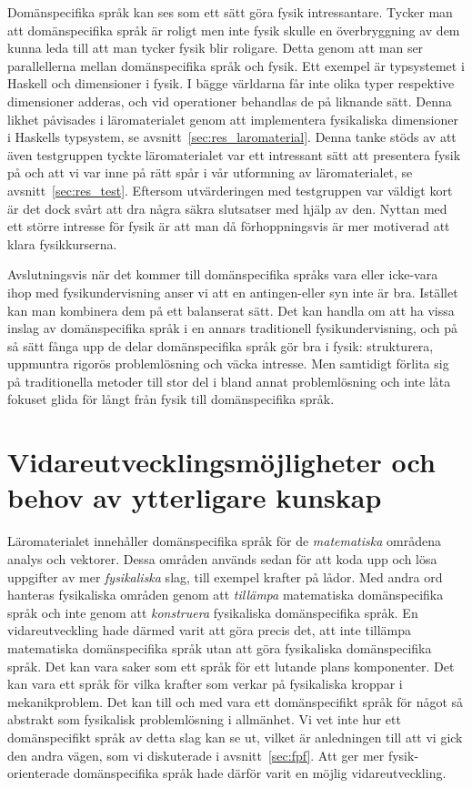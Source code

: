 Domänspecifika språk kan ses som ett sätt göra fysik intressantare. Tycker man
att domänspecifika språk är roligt men inte fysik skulle en överbryggning av dem
kunna leda till att man tycker fysik blir roligare. Detta genom att man ser
parallellerna mellan domänspecifika språk och fysik. Ett exempel är typsystemet i
Haskell och dimensioner i fysik. I bägge världarna får inte olika typer
respektive dimensioner adderas, och vid operationer behandlas de på liknande
sätt. Denna likhet påvisades i läromaterialet genom att implementera fysikaliska
dimensioner i Haskells typsystem, se avsnitt~\ref{sec:res_laromaterial}. Denna
tanke stöds av att även testgruppen tyckte läromaterialet var ett intressant sätt
att presentera fysik på och att vi var inne på rätt spår i vår utformning av
läromaterialet, se avsnitt~\ref{sec:res_test}. Eftersom utvärderingen med
testgruppen var väldigt kort är det dock svårt att dra några säkra slutsatser
med hjälp av den. Nyttan med ett större intresse för fysik är att man
då förhoppningsvis är mer motiverad att klara fysikkurserna.

Avslutningsvis när det kommer till domänspecifika språks vara eller icke-vara
ihop med fysikundervisning anser vi att en antingen-eller syn inte är bra.
Istället kan man kombinera dem på ett balanserat sätt. Det kan handla om att ha
vissa inslag av domänspecifika språk i en annars traditionell fysikundervisning,
och på så sätt fånga upp de delar domänspecifika språk gör bra i fysik:
strukturera, uppmuntra rigorös problemlösning och väcka intresse. Men samtidigt
förlita sig på traditionella metoder till stor del i bland annat problemlösning
och inte låta fokuset glida för långt från fysik till domänspecifika språk.

\section{Vidareutvecklingsmöjligheter och behov av ytterligare kunskap}

Läromaterialet innehåller domänspecifika språk för de \textit{matematiska}
områdena analys och vektorer. Dessa områden används sedan för att koda upp och
lösa uppgifter av mer \textit{fysikaliska} slag, till exempel krafter på lådor. Med andra ord hanteras fysikaliska områden genom att \textit{tillämpa} matematiska domänspecifika språk och inte genom att \textit{konstruera} fysikaliska domänspecifika språk. En vidareutveckling
hade därmed varit att göra precis det, att inte tillämpa matematiska
domänspecifika språk utan att göra fysikaliska domänspecifika språk. Det kan vara
saker som ett språk för ett lutande plans komponenter. Det kan vara ett
språk för vilka krafter som verkar på fysikaliska kroppar i mekanikproblem.
Det kan till och med vara ett domänspecifikt språk för något så abstrakt som
fysikalisk problemlösning i allmänhet. Vi vet inte hur ett domänspecifikt språk
av detta slag kan se ut, vilket är anledningen till att vi gick den andra vägen,
som vi diskuterade i avsnitt~\ref{sec:fpf}. Att ger mer fysik-orienterade
domänspecifika språk hade därför varit en möjlig vidareutveckling.

